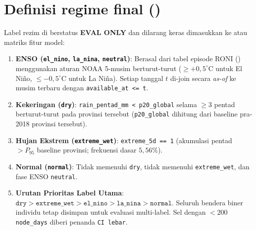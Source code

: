 \documentclass[11pt,a4paper]{article}
\begin{document}
\section{Definisi regime final ()}
Label rezim di  berstatus \textbf{EVAL ONLY} dan dilarang keras dimasukkan ke  atau matriks fitur model:
\begin{enumerate}
  \item \textbf{ENSO (\texttt{el\_nino}, \texttt{la\_nina}, \texttt{neutral})}: Berasal dari tabel episode RONI () menggunakan aturan NOAA 5-musim berturut-turut ($\ge +0{,}5^\circ\text{C}$ untuk El Ni\~no, $\le -0{,}5^\circ\text{C}$ untuk La Ni\~na). Setiap tanggal $t$ di-join secara \emph{as-of} ke musim terbaru dengan \texttt{available\_at <= t}.
  \item \textbf{Kekeringan (\texttt{dry})}: \texttt{rain\_pentad\_mm < p20\_global} selama $\ge 3$ pentad berturut-turut pada provinsi tersebut (\texttt{p20\_global} dihitung dari baseline pra-2018 provinsi tersebut).
  \item \textbf{Hujan Ekstrem (\texttt{extreme\_wet})}: \texttt{extreme\_5d == 1} (akumulasi pentad $> P_{95}$ baseline provinsi; frekuensi dasar $5{,}56\%$).
  \item \textbf{Normal (\texttt{normal})}: Tidak memenuhi \texttt{dry}, tidak memenuhi \texttt{extreme\_wet}, dan fase ENSO \texttt{neutral}.
  \item \textbf{Urutan Prioritas Label Utama}: $\texttt{dry} > \texttt{extreme\_wet} > \texttt{el\_nino} > \texttt{la\_nina} > \texttt{normal}$. Seluruh bendera biner individu tetap disimpan untuk evaluasi multi-label. Sel dengan $< 200$ \texttt{node\_days} diberi penanda \texttt{CI lebar}.
\end{enumerate}
\end{document}
